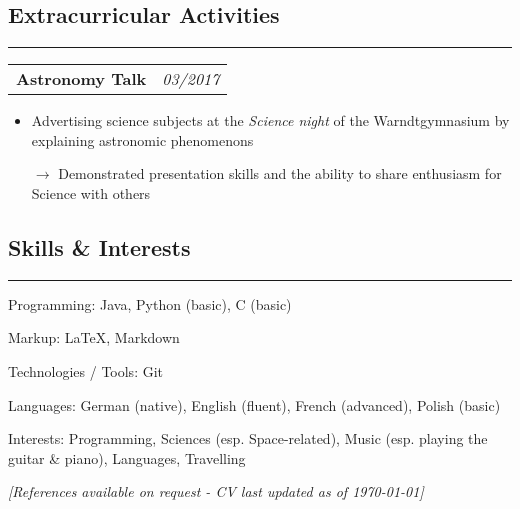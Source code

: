 \documentclass[10pt,letterpaper]{article}
\makeatletter
\newcommand{\headerrow}[2]
{\begin{tabular*}{\linewidth}{l@{\extracolsep{\fill}}r}
	#1 &
	#2 \\
\end{tabular*}}
\makeatother
\begin{document}

\subsection*{Extracurricular Activities}
\hrule
\vspace{0.4em}

\noindent
\headerrow{\textbf{Astronomy Talk}}{\emph{03/2017}}
\vspace{-1.6em}
\begin{itemize}
    \setlength\itemsep{0em}
    \item Advertising science subjects at the \emph{Science night} of the Warndtgymnasium by explaining astronomic phenomenons
    \item[$\rightarrow$] Demonstrated presentation skills and the ability to share enthusiasm for Science with others
\end{itemize}



\subsection*{Skills \& Interests}
\hrule
\vspace{0.4em}
\begin{description*}
	\item[Programming:]
	Java, Python (basic), C (basic)
    	\item[Markup:]
    	\LaTeX, Markdown
	\item[Technologies / Tools:]
	Git
	\item[Languages:]
	German (native), English (fluent), French (advanced), Polish (basic)
   	\item[Interests:]
	Programming, Sciences (esp. Space-related), Music (esp. playing the guitar \& piano), Languages, Travelling
\end{description*}



\hfill \small \textit{[References available on request - CV last updated as of {\today}]}
\end{document}
